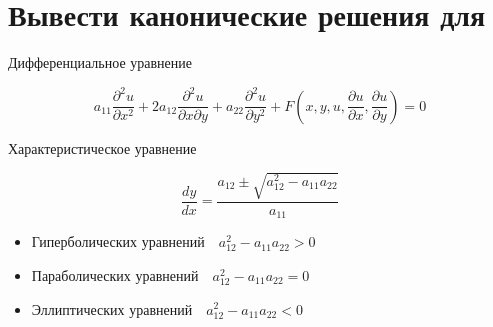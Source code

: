 \documentclass[12pt,a4paper]{article}
\begin{document}
\section{Вывести канонические решения для}
Дифференциальное уравнение

\begin{equation*}
    a_{11} \frac{\partial^2 u}{\partial x^2} + 2a_{12} \frac{\partial^2 u}{\partial x \partial y} + a_{22} \frac{\partial^2 u}{\partial y^2} + F\left(x,y,u,\frac{\partial u}{\partial x},\frac{\partial u}{\partial y}\right) = 0
\end{equation*}

Характеристическое уравнение

\begin{equation*}
    \frac{dy}{dx} = \frac{a_{12} \pm \sqrt{a_{12}^2 - a_{11}a_{22}}}{a_{11}}
\end{equation*}

\begin{itemize}
    \item Гиперболических уравнений$ \quad a^2_{12} - a_{11}a_{22} > 0$
    \item Параболических уравнений$ \quad a^2_{12} - a_{11}a_{22} = 0$
    \item Эллиптических уравнений$ \quad a^2_{12} - a_{11}a_{22} < 0$
\end{itemize}

\begin{center}
\end{center}
\end{document}
